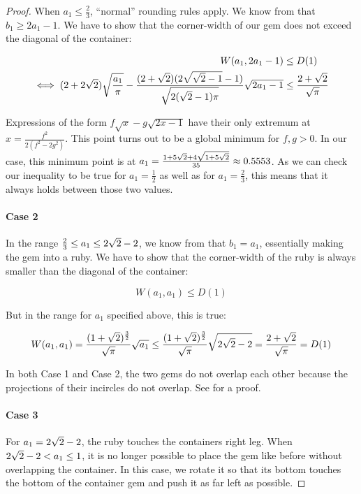 \documentclass[a4paper,style=print,oneside,bibliography=totoc,nexus,lnum,extramargin]{tubsbook}
\begin{document}
\begin{proof}
    When $a_1 \le \frac{2}{3}$, “normal” rounding rules apply. We know from  that $b_1 \ge 2a_1 - 1$. We have to show that the corner-width of our gem does not exceed the diagonal of the container:

    \begin{align*}
        W(a_1, 2a_1-1) &\le D(1)\\
        \iff (2+2\sqrt{2})\sqrt{\frac{a_1}{\pi}} - \frac{(2+\sqrt{2})(2\sqrt{\sqrt{2}-1}-1)}{\sqrt{2(\sqrt{2}-1)\pi}}\sqrt{2a_1-1} &\le \frac{2+\sqrt{2}}{\sqrt{\pi}}
    \end{align*}

    Expressions of the form $f\sqrt{x} - g\sqrt{2x-1}$ have their only extremum at $x = \frac{f^2}{2(f^2-2g^2)}$. This point turns out to be a global minimum for $f,g > 0$.
    In our case, this minimum point is at $a_1 = \frac{1+5\sqrt{2}+4\sqrt{1+5\sqrt{2}}}{35} \approx 0.5553$.
    As we can check our inequality to be true for $a_1 = \frac{1}{2}$ as well as for $a_1 = \frac 2 3$, this means that it always holds between those two values.

    \paragraph{Case 2}

    In the range $\frac{2}{3} \le a_1 \le 2\sqrt{2}-2$, we know from  that $b_1 = a_1$, essentially making the gem into a ruby. We have to show that the corner-width of the ruby is always smaller than the diagonal of the container:

    $$W(a_1, a_1) \le D(1)$$

    But in the range for $a_1$ specified above, this is true:

    $$W(a_1, a_1) = \frac{(1+\sqrt{2})^{\frac{3}{2}}}{\sqrt{\pi}}\sqrt{a_1} \le \frac{(1+\sqrt{2})^{\frac{3}{2}}}{\sqrt{\pi}}\sqrt{2\sqrt{2}-2} = \frac{2+\sqrt{2}}{\sqrt{\pi}} = D(1)$$

    In both Case 1 and Case 2, the two gems do not overlap each other because the projections of their incircles do not overlap. See  for a proof.

    \paragraph{Case 3}

    For $a_1 = 2\sqrt{2}-2$, the ruby touches the containers right leg.
    When $2\sqrt{2}-2 < a_1 \le 1$, it is no longer possible to place the gem like before without overlapping the container. In this case, we rotate it so that its bottom touches the bottom of the container gem and push it as far left as possible.


\end{proof}
\end{document}
